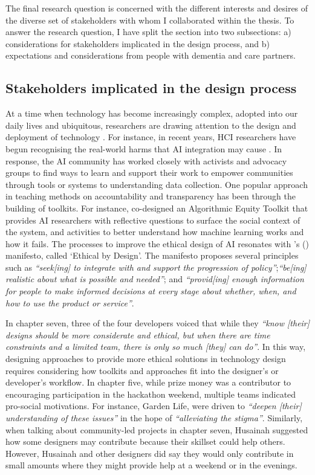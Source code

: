 The final research question is concerned with the different interests and desires of the diverse set of stakeholders with whom I collaborated within the thesis. To answer the research question, I have split the section into two subsections: a) considerations for stakeholders implicated in the design process, and b) expectations and considerations from people with dementia and care partners.

\subsection{Stakeholders implicated in the design process}
\label{DevsDesigners}
At a time when technology has become increasingly complex, adopted into our daily lives and ubiquitous, researchers are drawing attention to the design and deployment of technology \citep{west_data_2019}. For instance, in recent years, HCI researchers have begun recognising the real-world harms that AI integration may cause \citep{borenstein2021emerging}. In response, the AI community has worked closely with activists and advocacy groups to find ways to learn and support their work to empower communities through tools or systems to understanding data collection. One popular approach in teaching methods on accountability and transparency has been through the building of toolkits. For instance, \cite{krafft2021action} co-designed an Algorithmic Equity Toolkit that provides AI researchers with reflective questions to surface the social context of the system, and activities to better understand how machine learning works and how it fails. The processes to improve the ethical design of AI resonates with \citeauthor{mulvenna_ethical_2017}'s (\citeyear{mulvenna_ethical_2017}) manifesto, called `Ethical by Design'. The manifesto proposes several principles such as \textit{``seek[ing] to integrate with and support the progression of policy''};\textit{``be[ing] realistic about what is possible and needed''}; and \textit{``provid[ing] enough information for people to make informed decisions at every stage about whether, when, and how to use the product or service''}. 

In chapter seven, three of the four developers voiced that while they \textit{``know [their] designs should be more considerate and ethical, but when there are time constraints and a limited team, there is only so much [they] can do''}. In this way, designing approaches to provide more ethical solutions in technology design requires considering how toolkits and approaches fit into the designer's or developer's workflow. In chapter five, while prize money was a contributor to encouraging participation in the hackathon weekend, multiple teams indicated pro-social motivations. For instance, Garden Life, were driven to \textit{``deepen [their] understanding of these issues''} in the hope of \textit{``alleviating the stigma''}. Similarly, when talking about community-led projects in chapter seven, Husainah suggested how some designers may contribute because their skillset could help others. However, Husainah and other designers did say they would only contribute in small amounts where they might provide help at a weekend or in the evenings. 

